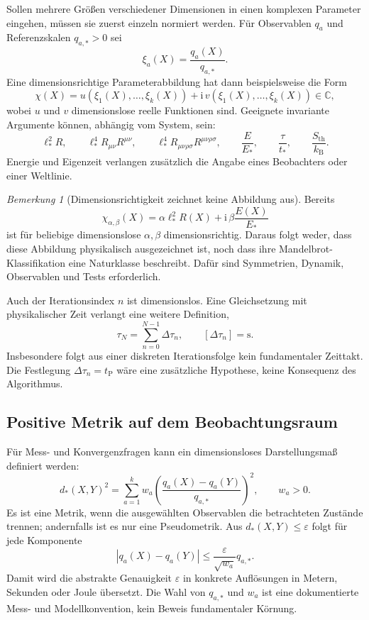 \documentclass[11pt,a4paper]{article}
\theoremstyle{remark}
\newtheorem{bemerkung}{Bemerkung}[section]
\newcommand{\C}{\mathbb{C}}
\newcommand{\eps}{\varepsilon}
\begin{document}
Sollen mehrere Größen verschiedener Dimensionen in einen komplexen Parameter
eingehen, müssen sie zuerst einzeln normiert werden. Für Observablen \(q_a\)
und Referenzskalen \(q_{a,*}>0\) sei
\[
  \xi_a(X)=\frac{q_a(X)}{q_{a,*}}.
\]
Eine dimensionsrichtige Parameterabbildung hat dann beispielsweise die Form
\[
  \chi(X)=u(\xi_1(X),\ldots,\xi_k(X))
  +\mathrm i\,v(\xi_1(X),\ldots,\xi_k(X))\in\C,
\]
wobei \(u\) und \(v\) dimensionslose reelle Funktionen sind. Geeignete
invariante Argumente können, abhängig vom System, sein:
\[
  \ell_*^2R,\qquad
  \ell_*^4R_{\mu\nu}R^{\mu\nu},\qquad
  \ell_*^4R_{\mu\nu\rho\sigma}R^{\mu\nu\rho\sigma},\qquad
  \frac{E}{E_*},\qquad
  \frac{\tau}{t_*},\qquad
  \frac{S_{\mathrm{th}}}{k_{\mathrm B}}.
\]
Energie und Eigenzeit verlangen zusätzlich die Angabe eines Beobachters oder
einer Weltlinie.

\begin{bemerkung}[Dimensionsrichtigkeit zeichnet keine Abbildung aus]
Bereits
\[
  \chi_{\alpha,\beta}(X)=
  \alpha\ell_*^2R(X)+\mathrm i\,\beta\frac{E(X)}{E_*}
\]
ist für beliebige dimensionslose \(\alpha,\beta\) dimensionsrichtig. Daraus
folgt weder, dass diese Abbildung physikalisch ausgezeichnet ist, noch dass
ihre Mandelbrot-Klassifikation eine Naturklasse beschreibt. Dafür sind
Symmetrien, Dynamik, Observablen und Tests erforderlich.
\end{bemerkung}

Auch der Iterationsindex \(n\) ist dimensionslos. Eine Gleichsetzung mit
physikalischer Zeit verlangt eine weitere Definition,
\[
  \tau_N=\sum_{n=0}^{N-1}\Delta\tau_n,
  \qquad [\Delta\tau_n]=\mathrm s.
\]
Insbesondere folgt aus einer diskreten Iterationsfolge kein fundamentaler
Zeittakt. Die Festlegung \(\Delta\tau_n=t_{\mathrm P}\) wäre eine zusätzliche
Hypothese, keine Konsequenz des Algorithmus.

\subsection{Positive Metrik auf dem Beobachtungsraum}

Für Mess- und Konvergenzfragen kann ein dimensionsloses Darstellungsmaß
definiert werden:
\[
  d_*(X,Y)^2=
  \sum_{a=1}^{k}w_a
  \left(\frac{q_a(X)-q_a(Y)}{q_{a,*}}\right)^2,
  \qquad w_a>0.
\]
Es ist eine Metrik, wenn die ausgewählten Observablen die betrachteten
Zustände trennen; andernfalls ist es nur eine Pseudometrik. Aus
\(d_*(X,Y)\le\eps\) folgt für jede Komponente
\[
  |q_a(X)-q_a(Y)|\le
  \frac{\eps}{\sqrt{w_a}}q_{a,*}.
\]
Damit wird die abstrakte Genauigkeit \(\eps\) in konkrete Auflösungen in
Metern, Sekunden oder Joule übersetzt. Die Wahl von \(q_{a,*}\) und \(w_a\)
ist eine dokumentierte Mess- und Modellkonvention, kein Beweis fundamentaler
Körnung.
\end{document}
